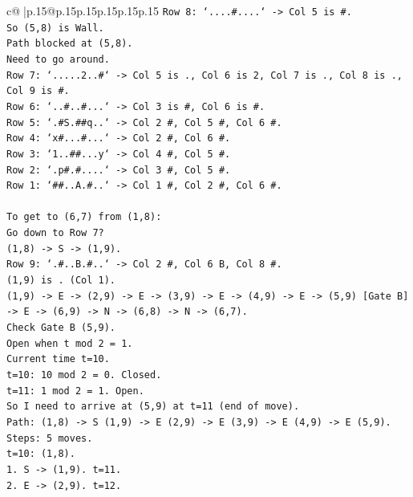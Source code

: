 \documentclass{article}
\begin{document}
{\begin{supertabular}{c@{$\;$}|p{.15\linewidth}@{}p{.15\linewidth}p{.15\linewidth}p{.15\linewidth}p{.15\linewidth}p{.15\linewidth}}
{{{\texttt{Row 8: `....\#....` {-}> Col 5 is \#.} \\
\texttt{So (5,8) is Wall.} \\
\texttt{Path blocked at (5,8).} \\
\texttt{Need to go around.} \\
\texttt{Row 7: `.....2..\#` {-}> Col 5 is ., Col 6 is 2, Col 7 is ., Col 8 is ., Col 9 is \#.} \\
\texttt{Row 6: `..\#..\#...` {-}> Col 3 is \#, Col 6 is \#.} \\
\texttt{Row 5: `.\#S.\#\#q..` {-}> Col 2 \#, Col 5 \#, Col 6 \#.} \\
\texttt{Row 4: `x\#...\#...` {-}> Col 2 \#, Col 6 \#.} \\
\texttt{Row 3: `1..\#\#...y` {-}> Col 4 \#, Col 5 \#.} \\
\texttt{Row 2: `.p\#.\#....` {-}> Col 3 \#, Col 5 \#.} \\
\texttt{Row 1: `\#\#..A.\#..` {-}> Col 1 \#, Col 2 \#, Col 6 \#.} \\
\\ 
\texttt{To get to (6,7) from (1,8):} \\
\texttt{Go down to Row 7?} \\
\texttt{(1,8) {-}> S {-}> (1,9).} \\
\texttt{Row 9: `.\#..B.\#..` {-}> Col 2 \#, Col 6 B, Col 8 \#.} \\
\texttt{(1,9) is . (Col 1).} \\
\texttt{(1,9) {-}> E {-}> (2,9) {-}> E {-}> (3,9) {-}> E {-}> (4,9) {-}> E {-}> (5,9) {[}Gate B{]} {-}> E {-}> (6,9) {-}> N {-}> (6,8) {-}> N {-}> (6,7).} \\
\texttt{Check Gate B (5,9).} \\
\texttt{Open when t mod 2 = 1.} \\
\texttt{Current time t=10.} \\
\texttt{t=10: 10 mod 2 = 0. Closed.} \\
\texttt{t=11: 1 mod 2 = 1. Open.} \\
\texttt{So I need to arrive at (5,9) at t=11 (end of move).} \\
\texttt{Path: (1,8) {-}> S (1,9) {-}> E (2,9) {-}> E (3,9) {-}> E (4,9) {-}> E (5,9).} \\
\texttt{Steps: 5 moves.} \\
\texttt{t=10: (1,8).} \\
\texttt{1. S {-}> (1,9). t=11.} \\
\texttt{2. E {-}> (2,9). t=12.} \\
}}}
\end{supertabular}}
\end{document}
